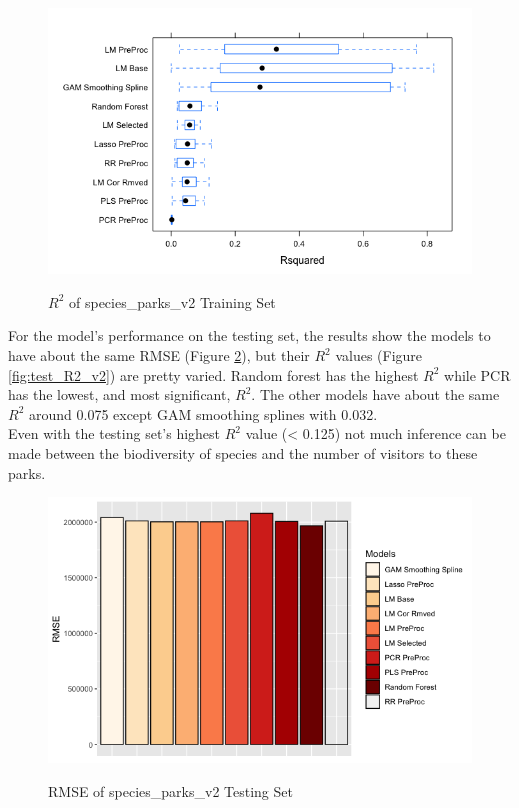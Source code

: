 \documentclass[stu, floatsintext, 11pt]{apa7}
\begin{document}
\begin{figure}[h!]
\centering
\caption{$R^2$ of species\_parks\_v2 Training Set}
\includegraphics[scale=0.6]{images/train_R2_v2.png}
\label{fig:train_R2_v2}
\end{figure}

For the model's performance on the testing set, the results show the models to have about the same RMSE (Figure \ref{fig:test_RMSE_v2}), but their $R^2$ values (Figure \ref{fig:test_R2_v2}) are pretty varied. Random forest has the highest $R^2$ while PCR has the lowest, and most significant, $R^2$. The other models have about the same $R^2$ around 0.075 except GAM smoothing splines with 0.032. \\

Even with the testing set's highest $R^2$ value (< 0.125) not much inference can be made between the biodiversity of species and the number of visitors to these parks.

\begin{figure}[h!]
\centering
\caption{RMSE of species\_parks\_v2 Testing Set}
\includegraphics[scale=0.6]{images/test_RMSE_v2.png}
\label{fig:test_RMSE_v2}
\end{figure}
\end{document}
